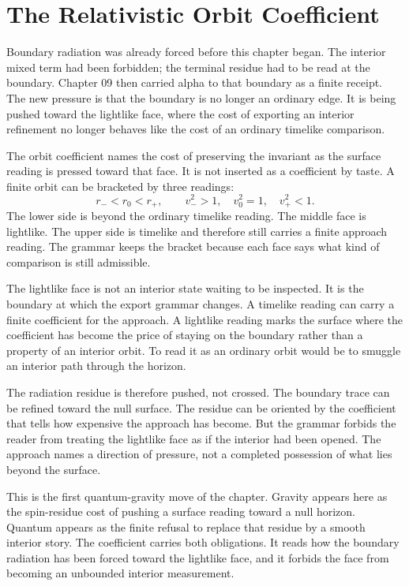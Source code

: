 \section{The Relativistic Orbit Coefficient}

Boundary radiation was already forced before this chapter began. The
interior mixed term had been forbidden; the terminal residue had to be read
at the boundary. Chapter 09 then carried alpha to that boundary as a finite
receipt. The new pressure is that the boundary is no longer an ordinary
edge. It is being pushed toward the lightlike face, where the cost of
exporting an interior refinement no longer behaves like the cost of an
ordinary timelike comparison.

The orbit coefficient names the cost of preserving the invariant as the
surface reading is pressed toward that face. It is not inserted as a
coefficient by taste. A finite orbit can be bracketed by three readings:
\[
  r_- < r_0 < r_+,
  \qquad
  v_-^2 > 1,\quad v_0^2 = 1,\quad v_+^2 < 1.
\]
The lower side is beyond the ordinary timelike reading. The middle face is
lightlike. The upper side is timelike and therefore still carries a finite
approach reading. The grammar keeps the bracket because each face says what
kind of comparison is still admissible.

The lightlike face is not an interior state waiting to be inspected. It is
the boundary at which the export grammar changes. A timelike reading can
carry a finite coefficient for the approach. A lightlike reading marks the
surface where the coefficient has become the price of staying on the
boundary rather than a property of an interior orbit. To read it as an
ordinary orbit would be to smuggle an interior path through the horizon.

The radiation residue is therefore pushed, not crossed. The boundary trace
can be refined toward the null surface. The residue can be oriented by the
coefficient that tells how expensive the approach has become. But the
grammar forbids the reader from treating the lightlike face as if the
interior had been opened. The approach names a direction of pressure, not a
completed possession of what lies beyond the surface.

This is the first quantum-gravity move of the chapter. Gravity appears here
as the spin-residue cost of pushing a surface reading toward a null horizon.
Quantum appears as the finite refusal to replace that residue by a smooth
interior story. The coefficient carries both obligations. It reads how the
boundary radiation has been forced toward the lightlike face, and it
forbids the face from becoming an unbounded interior measurement.

